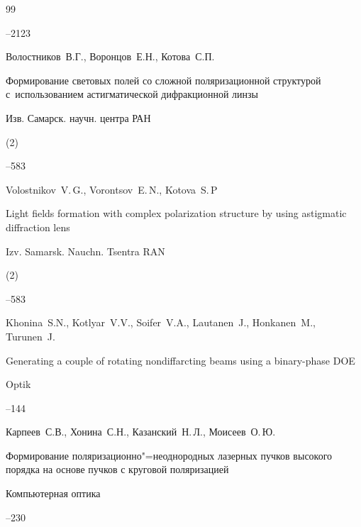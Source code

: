 \begin{thebibliography}{99}


--2123





\by Волостников~В.Г., Воронцов~Е.Н., Котова~С.П.

\paper Формирование световых полей со сложной поляризационной структурой с~использованием астигматической дифракционной линзы

\jour Изв. Самарск. научн. центра РАН


(2)


--583

\misctransl

\by  Volostnikov~V.\,G., Vorontsov~E.\,N.,  Kotova~S.\,P

\paper  Light fields formation  with complex polarization structure by using astigmatic diffraction lens

\jour Izv. Samarsk. Nauchn. Tsentra RAN


(2)


--583






\by Khonina~S.N., Kotlyar~V.V., Soifer~V.A., Lautanen~J., Honkanen~M., Turunen~J.

\paper Generating a couple of rotating nondiffarcting beams using a binary-phase DOE

\jour Optik




--144




\by Карпеев~С.В., Хонина~С.Н., Казанский~Н.\,Л., Моисеев~О.\,Ю.

\paper Формирование поляризационно"=неоднородных лазерных пучков высокого порядка на основе пучков с круговой поляризацией

\jour Компьютерная оптика

   --230


\end{thebibliography}
